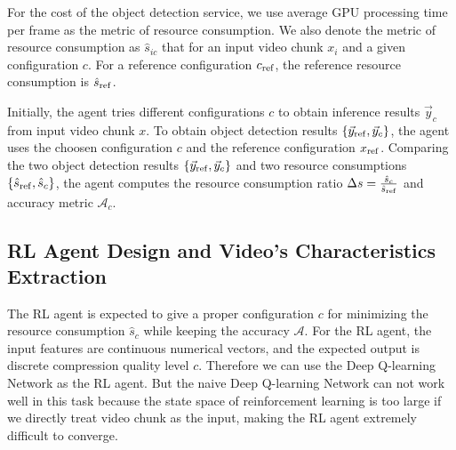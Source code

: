 For the cost of the object detection service, we use average GPU processing time per frame as the metric of resource consumption. We also denote the metric of resource consumption as $ \hat{s}_{ic} $ that for an input video chunk $ x_i $ and a given configuration $ c $. For a reference configuration $ c_{\rm ref} $, the reference resource consumption is $ \hat{s}_{\rm ref} $.

Initially, the agent tries different configurations $ c $ to obtain inference results $\vec{y}_c$ from input video chunk $ x $. To obtain object detection results $ \{\vec{y}_{\rm ref}, \vec{y}_c\} $, the agent uses the choosen configuration $ c $ and the reference configuration $ x_{\rm ref} $. Comparing the two object detection results $ \{\vec{y}_{\rm ref}, \vec{y}_c\} $ and two resource consumptions $ \{\hat{s}_{\rm ref}, \hat{s}_c\} $, the agent computes the resource consumption ratio $ \Delta s = \frac{\hat{s}_c}{\hat{s}_{\rm ref}} $ and accuracy metric $ \mathcal{A}_c $.

\subsection{RL Agent Design and Video's Characteristics Extraction}

The RL agent is expected to give a proper configuration $ c $ for minimizing the resource consumption $ \hat{s}_c $ while keeping the accuracy $ \mathcal{A} $. For the RL agent, the input features are continuous numerical vectors, and the expected output is discrete compression quality level $ c $. Therefore we can use the Deep Q-learning Network \cite{DQN} as the RL agent. But the naive Deep Q-learning Network can not work well in this task because the state space of reinforcement learning is too large if we directly treat video chunk as the input, making the RL agent extremely difficult to converge.  


%

